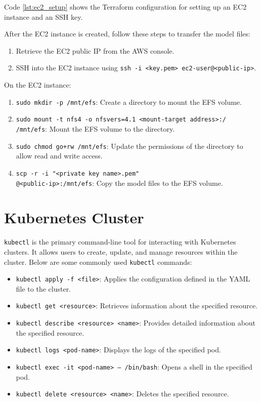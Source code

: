 Code \ref{lst:ec2_setup} shows the Terraform configuration for setting up an EC2 instance and an SSH key. 

After the EC2 instance is created, follow these steps to transfer the model files:

\begin{enumerate}
    \item Retrieve the EC2 public IP from the AWS console.
    \item SSH into the EC2 instance using \texttt{ssh -i <key.pem> ec2-user@<public-ip>}.
\end{enumerate}

On the EC2 instance:
\begin{enumerate}
    \item \texttt{sudo mkdir -p /mnt/efs}: Create a directory to mount the EFS volume.
    \item 
        \begin{sloppypar}
        \texttt{sudo mount -t nfs4 -o nfsvers=4.1 <mount-target address>:/ /mnt/efs}: Mount the EFS volume to the directory.
        \end{sloppypar}
    \item \texttt{sudo chmod go+rw /mnt/efs}: Update the permissions of the directory to allow read and write access.

    \item 
        \begin{sloppypar}
        \texttt{scp -r -i "<private key name>.pem"   \\<model-directory>@<public-ip>:/mnt/efs}: Copy the model files to the EFS volume.
        \end{sloppypar}
\end{enumerate}

\section{Kubernetes Cluster}
\texttt{kubectl} is the primary command-line tool for interacting with Kubernetes clusters. It allows users to create, update, and manage resources within the cluster. Below are some commonly used \texttt{kubectl} commands:

\begin{itemize}
    \item \texttt{kubectl apply -f <file>}: Applies the configuration defined in the YAML file to the cluster.
    \item \texttt{kubectl get <resource>}: Retrieves information about the specified resource.
    \item \texttt{kubectl describe <resource> <name>}: Provides detailed information about the specified resource.
    \item \texttt{kubectl logs <pod-name>}: Displays the logs of the specified pod.
    \item \texttt{kubectl exec -it <pod-name> -- /bin/bash}: Opens a shell in the specified pod.
    \item \texttt{kubectl delete <resource> <name>}: Deletes the specified resource.
\end{itemize}

